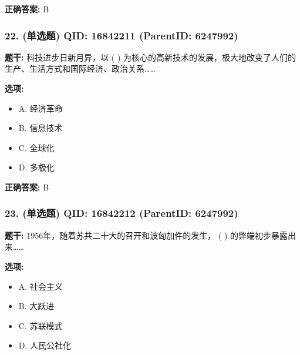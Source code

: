 \documentclass[12pt,UTF8]{ctexart}
\begin{document}
\textbf{正确答案:}
B

\vspace{0.3em}\hrulefill\vspace{0.7em}

\subsubsection*{22. (单选题) \small QID: 16842211 (ParentID: 6247992)}

\textbf{题干:}
科技进步日新月异，以 ( ) 为核心的高新技术的发展，极大地改变了人们的生产、生活方式和国际经济、政治关系……



\textbf{选项:}
\begin{itemize}[leftmargin=*]

  \item A. 经济革命

  \item B. 信息技术

  \item C. 全球化

  \item D. 多极化

\end{itemize}

\textbf{正确答案:}
B

\vspace{0.3em}\hrulefill\vspace{0.7em}

\subsubsection*{23. (单选题) \small QID: 16842212 (ParentID: 6247992)}

\textbf{题干:}
1956年，随着苏共二十大的召开和波匈加件的发生， ( ) 的弊端初步暴露出来……



\textbf{选项:}
\begin{itemize}[leftmargin=*]

  \item A. 社会主义

  \item B. 大跃进

  \item C. 苏联模式

  \item D. 人民公社化

\end{itemize}
\end{document}
